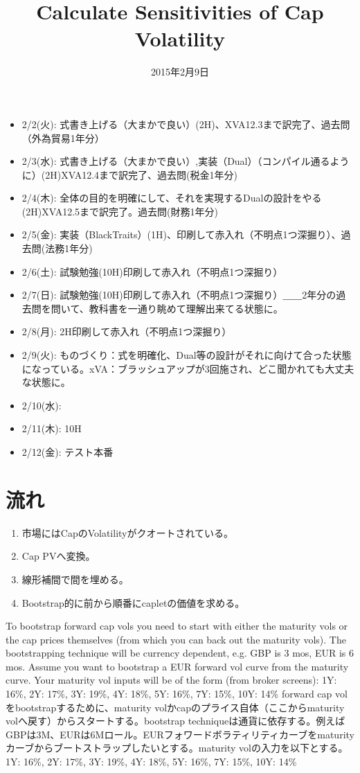 \documentclass[platex]{jsarticle}
\title{Calculate Sensitivities of Cap Volatility}
\author{}
\date{2015年2月9日}
\numberwithin{equation}{section}
\begin{document}
\maketitle
{}
\begin{itemize}
\item 2/2(火): 式書き上げる（大まかで良い）(2H)、XVA12.3まで訳完了、過去問（外為貿易1年分）
\item 2/3(水): 式書き上げる（大まかで良い）,実装（Dual）（コンパイル通るように）(2H)XVA12.4まで訳完了、過去問(税金1年分)
\item 2/4(木): 全体の目的を明確にして、それを実現するDualの設計をやる(2H)XVA12.5まで訳完了。過去問(財務1年分)
\item 2/5(金): 実装（BlackTraits）(1H)、印刷して赤入れ（不明点1つ深掘り）、過去問(法務1年分)
\item 2/6(土): 試験勉強(10H)印刷して赤入れ（不明点1つ深掘り）
\item 2/7(日): 試験勉強(10H)印刷して赤入れ（不明点1つ深掘り）＿＿2年分の過去問を問いて、教科書を一通り眺めて理解出来てる状態に。
\item 2/8(月): 2H印刷して赤入れ（不明点1つ深掘り）
\item 2/9(火): ものづくり：式を明確化、Dual等の設計がそれに向けて合った状態になっている。xVA：ブラッシュアップが3回施され、どこ聞かれても大丈夫な状態に。
\item 2/10(水): 
\item 2/11(木): 10H
\item 2/12(金): テスト本番
\end{itemize}
\fi

\section{流れ}
\begin{enumerate}
\item 市場にはCapのVolatilityがクオートされている。
\item Cap PVへ変換。
\item 線形補間で間を埋める。
\item Bootstrap的に前から順番にcapletの価値を求める。
\end{enumerate}
To bootstrap forward cap vols you need to start with either the maturity vols or the cap prices themselves (from which you can back out the maturity vols). The bootstrapping technique will be currency dependent, e.g. GBP is 3 mos, EUR is 6 mos. Assume you want to bootstrap a EUR forward vol curve from the maturity curve. Your maturity vol inputs will be of the form (from broker screens):
1Y: 16\%, 2Y: 17\%, 3Y: 19\%, 4Y: 18\%, 5Y: 16\%, 7Y: 15\%, 10Y: 14\%
\fi
forward cap volをbootstrapするために、maturity volかcapのプライス自体（ここからmaturity volへ戻す）からスタートする。bootstrap techniqueは通貨に依存する。例えばGBPは3M、EURは6Mロール。EURフォワードボラティリティカーブをmaturityカーブからブートストラップしたいとする。maturity volの入力を以下とする。
1Y: 16\%, 2Y: 17\%, 3Y: 19\%, 4Y: 18\%, 5Y: 16\%, 7Y: 15\%, 10Y: 14\%
\end{document}
